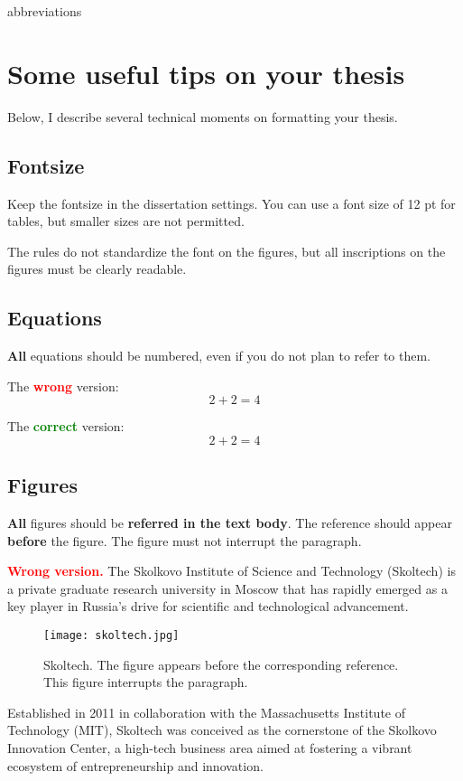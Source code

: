 abbreviations\chapter{Some useful tips on your thesis}

Below, I describe several technical moments on formatting your thesis. 
\section{Fontsize}

Keep the fontsize in the dissertation settings. You can use a font size of 12 pt for tables, but smaller sizes are not permitted. 

The rules do not standardize the font on the figures, but all inscriptions on the figures must be clearly readable.

\section{Equations}

\textbf{All} equations should be numbered, even if you do not plan to refer to them. 

The \textbf{\textcolor{red}{wrong}} version:
\[2 + 2 = 4\]

The \textbf{\textcolor{green}{correct}} version:
\begin{equation}
	2 + 2 = 4
\end{equation}

\section{Figures}

\textbf{All} figures should be \textbf{referred in the text body}. The reference should appear \textbf{before} the figure. The figure must not interrupt the paragraph. 

\textcolor{red}{\textbf{Wrong version.}} The Skolkovo Institute of Science and Technology (Skoltech) is a private graduate research university in Moscow that has rapidly emerged as a key player in Russia's drive for scientific and technological advancement. 
\begin{figure}[!h]
	\centering
	\texttt{[image: skoltech.jpg]}
	\caption{Skoltech. The figure appears before the corresponding reference. This figure interrupts the paragraph.}
	\label{fig:example}
\end{figure}
Established in 2011 in collaboration with the Massachusetts Institute of Technology (MIT), Skoltech was conceived as the cornerstone of the Skolkovo Innovation Center, a high-tech business area aimed at fostering a vibrant ecosystem of entrepreneurship and innovation.

